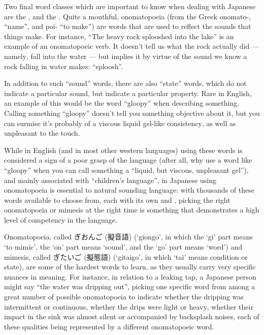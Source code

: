 \documentclass[11pt, b5paper, twoside, openright, onecolumn]{book}
\makeatletter
\newcommand*{\rubystack}[2]{{\relscale{0.5}%
  \begin{tabular}[b]{@{}c@{}}%
    {#1}\\%
   {\textscale{2}{#2}}%
  \end{tabular}}%
}
\DeclareRobustCommand*{\ruby}[2]{%
  \mbox{%
    \setlength{\parskip}{0ex}%
    \BeginAccSupp{method=pdfstringdef,ActualText={#1}}%
      \rubystack{\phantom{#2}}{#1}%
      \llap{%
        \rubystack{#2}{\phantom{#1}}%
      }%
    \EndAccSupp{}%
  }%
}
\renewcommand*{\ruby}[2]{#2 (#1)}%
\makeatother
\begin{document}
Two final word classes which are important to know when dealing with Japanese are the ‚ and the . Quite a mouthful‚ onomatopoeia (from the Greek onomato-‚ “name”‚ and poi- “to make”) are words that are used to reflect the sounds that things make. For instance‚ “The heavy rock splooshed into the lake” is an example of an onomatopoeic verb. It doesn’t tell us what the rock actually did — namely‚ fall into the water — but implies it by virtue of the sound we know a rock falling in water makes: “sploosh”.

In addition to such “sound” words‚ there are also “state” words‚ which do not indicate a particular sound‚ but indicate a particular property. Rare in English‚ an example of this would be the word “gloopy” when describing something. Calling something “gloopy” doesn’t tell you something objective about it‚ but you can surmise it’s probably of a viscous liquid gel-like consistency‚ as well as unpleasant to the touch.

While in English (and in most other western languages) using these words is considered a sign of a poor grasp of the language (after all‚ why use a word like “gloopy” when you can call something a “liquid‚ but viscous‚ unpleasant gel”)‚ and mainly associated with “children’s language”‚ in Japanese using onomatopoeia is essential to natural sounding language: with thousands of these words available to choose from‚ each with its own  and ‚ picking the right onomatopoeia or mimesis at the right time is something that demonstrates a high level of competency in the language.

Onomatopoeia‚ called \ruby{擬音語}{ぎおんご} (‘giongo’‚ in which the ‘gi’ part means ‘to mimic’‚ the ‘on’ part means ‘sound’‚ and the ‘go’ part means ‘word’) and mimesis‚ called \ruby{擬態語}{ぎたいご} (‘gitaigo’‚ in which ‘tai’ means condition or state)‚ are some of the hardest words to learn‚ as they usually carry very specific nuances in meaning. For instance‚ in relation to a leaking tap‚ a Japanese person might say “the water was dripping out”‚ picking one specific word from among a great number of possible onomatopoeia to indicate whether the dripping was intermittent or continuous‚ whether the drips were light or heavy‚ whether their impact in the sink was almost silent or accompanied by backsplash noises‚ each of these qualities being represented by a different onomatopoeic word.
\end{document}
